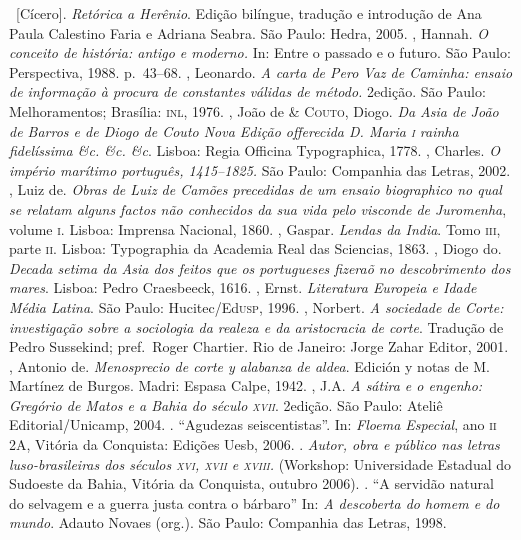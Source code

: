 \begin{bibliohedra}
\ [Cícero]. \textit{Retórica a Herênio}. Edição bilíngue, tradução
e introdução de Ana Paula Calestino Faria e Adriana Seabra. São Paulo:
Hedra, 2005.
, Hannah. \textit{O conceito de história: antigo e
moderno.} In: Entre o passado e o futuro. São Paulo: Perspectiva,
1988. p.~43--68. 
, Leonardo. \textit{A carta de Pero Vaz de Caminha: ensaio de
informação à procura de constantes válidas de método.} 2\ai edição. São
Paulo: Melhoramentos;  Brasília: \textsc{inl}, 1976.
, João de \& \textsc{Couto}, Diogo. \textit{Da Asia de João de Barros e de
Diogo de Couto Nova Edição offerecida D. Maria \textsc{i} rainha fidelíssima
\&c. \&c. \&c}. Lisboa: Regia Officina Typographica, 1778.
, Charles. \textit{O império marítimo português, 1415--1825. } São
Paulo: Companhia das Letras, 2002.
, Luiz de. \textit{Obras de Luiz de Camões precedidas de um ensaio
biographico no qual se relatam alguns factos não conhecidos da sua vida
pelo visconde de Juromenha}, volume \textsc{i}. Lisboa: Imprensa Nacional, 1860.
, Gaspar. \textit{Lendas da India}.
Tomo \textsc{iii}, parte \textsc{ii}. Lisboa: Typographia da Academia Real
das Sciencias, 1863.
, Diogo do. \textit{Decada setima da Asia dos feitos que os
portugueses fizeraõ no descobrimento dos mares}. Lisboa: Pedro Craesbeeck, 1616. 
, Ernst. \textit{Literatura Europeia e Idade Média Latina}. São
Paulo: Hucitec/Ed\textsc{usp}, 1996.
, Norbert. \textit{A sociedade de Corte: investigação sobre a
sociologia da realeza e da aristocracia de corte}. Tradução de Pedro
Sussekind; pref.~Roger Chartier. Rio de Janeiro: Jorge Zahar
Editor, 2001.
, Antonio de. \textit{Menosprecio de corte y alabanza de aldea}.
Edición y notas de M. Martínez de Burgos. Madri: Espasa Calpe, 1942.
, J.A. \textit{A sátira e o engenho: Gregório de Matos e a Bahia
do século \textsc{xvii}}. 2\ai edição. São Paulo: Ateliê Editorial/Unicamp,
2004.
\titidem. ``Agudezas seiscentistas''. In: \textit{Floema
Especial}, ano \textsc{ii} 2A, Vitória da Conquista: Edições Uesb, 2006. 
\titidem. \textit{Autor, obra e público nas letras luso-brasileiras 
dos séculos \textsc{xvi, xvii} e \textsc{xviii}.} (Workshop: Universidade
Estadual do Sudoeste da Bahia, Vitória da Conquista, outubro 2006).
\titidem. ``A servidão natural do selvagem e a
guerra justa contra o bárbaro'' In:  \textit{A descoberta do homem e do mundo}. 
Adauto Novaes (org.). São Paulo: Companhia das Letras, 1998.

\end{bibliohedra}

